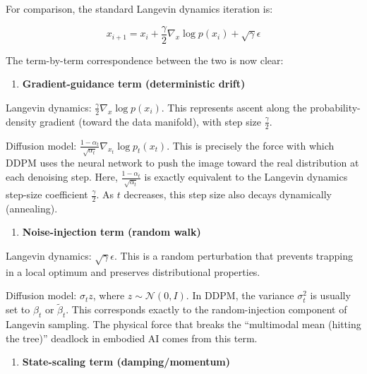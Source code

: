 For comparison, the standard Langevin dynamics iteration is:

\[
x_{i+1}=x_i+\frac{\gamma}{2}\nabla_x\log p(x_i)+\sqrt{\gamma}\epsilon
\]

The term-by-term correspondence between the two is now clear:

\begin{enumerate}
\def\labelenumi{\arabic{enumi}.}
\tightlist
\item
  \textbf{Gradient-guidance term (deterministic drift)}
\end{enumerate}

Langevin dynamics: \(\frac{\gamma}{2}\nabla_x\log p(x_i)\). This represents ascent along the probability-density gradient (toward the data manifold), with step size \(\frac{\gamma}{2}\).

Diffusion model: \(\frac{1-\alpha_t}{\sqrt{\alpha_t}}\nabla_{x_t}\log p_t(x_t)\). This is precisely the force with which DDPM uses the neural network to push the image toward the real distribution at each denoising step. Here, \(\frac{1-\alpha_t}{\sqrt{\alpha_t}}\) is exactly equivalent to the Langevin dynamics step-size coefficient \(\frac{\gamma}{2}\). As \(t\) decreases, this step size also decays dynamically (annealing).

\begin{enumerate}
\def\labelenumi{\arabic{enumi}.}
\setcounter{enumi}{1}
\tightlist
\item
  \textbf{Noise-injection term (random walk)}
\end{enumerate}

Langevin dynamics: \(\sqrt{\gamma}\epsilon\). This is a random perturbation that prevents trapping in a local optimum and preserves distributional properties.

Diffusion model: \(\sigma_t z\), where \(z\sim\mathcal{N}(0,I)\). In DDPM, the variance \(\sigma_t^2\) is usually set to \(\beta_t\) or \(\tilde{\beta}_t\). This corresponds exactly to the random-injection component of Langevin sampling. The physical force that breaks the ``multimodal mean (hitting the tree)'' deadlock in embodied AI comes from this term.

\begin{enumerate}
\def\labelenumi{\arabic{enumi}.}
\setcounter{enumi}{2}
\tightlist
\item
  \textbf{State-scaling term (damping/momentum)}
\end{enumerate}

